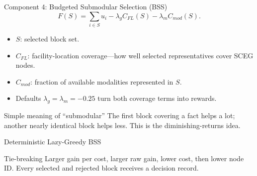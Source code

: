 \documentclass[aspectratio=169,10pt]{beamer}
\newcommand{\tightitems}{\setlength{\itemsep}{0.28em}\setlength{\parskip}{0pt}}
\begin{document}
\begin{frame}{Component 4: Budgeted Submodular Selection (BSS)}
\small
\[
F(S)=\sum_{i\in S}u_i-\lambda_gC_{FL}(S)-\lambda_mC_{mod}(S).
\]
\begin{itemize}\tightitems
  \item $S$: selected block set.
  \item $C_{FL}$: facility-location coverage---how well selected representatives cover SCEG nodes.
  \item $C_{mod}$: fraction of available modalities represented in $S$.
  \item Defaults $\lambda_g=\lambda_m=-0.25$ turn both coverage terms into rewards.
\end{itemize}
\begin{exampleblock}{Simple meaning of ``submodular''}
The first block covering a fact helps a lot; another nearly identical block helps less. This is
the diminishing-returns idea.
\end{exampleblock}
\end{frame}

\begin{frame}{Deterministic Lazy-Greedy BSS}
\scriptsize
\begin{center}
\end{center}
\begin{block}{Tie-breaking}
Larger gain per cost, larger raw gain, lower cost, then lower node ID. Every selected and rejected
block receives a decision record.
\end{block}
\end{frame}
\end{document}
